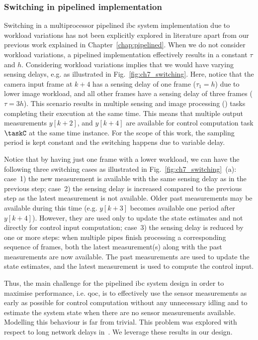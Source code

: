 \subsubsection{Switching in pipelined implementation}
\label{sec:ch7_switching_cases}
Switching in a multiprocessor pipelined \gls{ibc} system implementation due to workload variations has not been explicitly explored in literature apart from our previous work explained in Chapter~\ref{chap:pipelined}.
When we do not consider workload variations, a pipelined implementation effectively results in a constant $\tau$ and $h$.
Considering workload variations implies that we would have varying sensing delays, e.g. as illustrated in Fig.~\ref{fig:ch7_switching}. 
Here, notice that the camera input frame at $k+4$ has a sensing delay of one frame ($\tau_1=h$) due to lower image workload, and all other frames have a sensing delay of three frames ($\tau=3h$).
This scenario results in multiple sensing and image processing (\taskS) tasks completing their execution at the same time.
This means that multiple output measurements $y[k+2]$, and $y[k+4]$ are available for control computation task $\taskC$ at the same time instance.
For the scope of this work, the sampling period is kept constant and the switching happens due to variable delay.

Notice that by having just one frame with a lower workload, we can have the following three switching cases as illustrated in Fig.~\ref{fig:ch7_switching}~(a):
case~1) the new measurement is available with the same sensing delay as in the previous step; 
case~2) the sensing delay is increased compared to the previous step as the latest measurement is not available.
Older past measurements may be available during this time (e.g. $y[k+3]$ becomes available one period after $y[k+4]$). However, they are used only to update the state estimates and not directly for control input computation; 
case~3) the sensing delay is reduced by one or more steps: when multiple pipes finish processing a corresponding sequence of frames, both the latest measurement(s) along with the past measurements are now available.
The past measurements are used to update the state estimates, and the latest measurement is used to compute the control input.

Thus, the main challenge for the pipelined \gls{ibc} system design in order to maximise performance, i.e. \gls{qoc}, is to effectively use the sensor measurements as early as possible for control computation without any unnecessary idling and to estimate the system state when there are no sensor measurements available. Modelling this behaviour is far from trivial.
This problem was explored with respect to long network delays in~\cite{lincoln2000optimal}. We leverage these results in our design.

